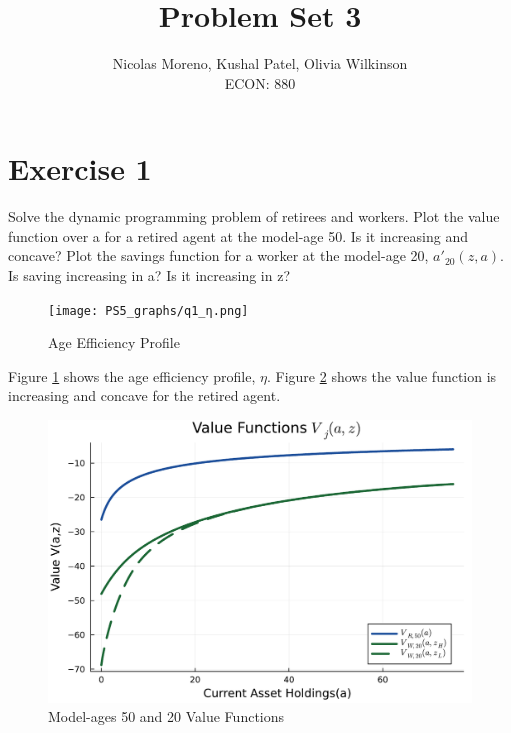 \documentclass[12pt]{article}
\begin{document}
 
\title{Problem Set 3}
\author{Nicolas Moreno, Kushal Patel, Olivia Wilkinson \\
ECON: 880}
\maketitle

\section{Exercise 1}
Solve the dynamic programming problem of retirees and workers. Plot the value function over a for a retired agent at the model-age 50. Is it increasing and concave? Plot the savings function for a worker at the
model-age 20, $a'_{20}(z, a)$. Is saving increasing in a? Is it increasing in z?

\begin{figure}[h!]
    \centering
    \caption{Age Efficiency Profile}
    \vspace{1cm}
    \texttt{[image: PS5\_graphs/q1\_η.png]}
    
    \label{fig:ageefficiency}
\end{figure}

Figure \ref{fig:ageefficiency} shows the age efficiency profile, $\eta$. Figure \ref{fig:val50} shows the value function is increasing and concave for the retired agent. 
\newpage

\begin{figure}[h!]
    \centering
    \caption{Model-ages 50 and 20 Value Functions}
    \vspace{1cm}
    \includegraphics[scale=0.5]{PS5_graphs/Value_Functions.pdf}
    
    \label{fig:val50}
\end{figure}
\end{document}
